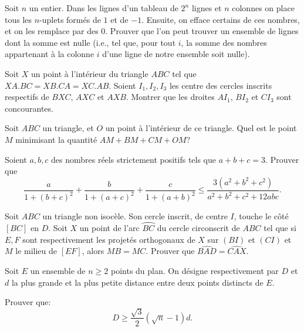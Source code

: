 \begin{exo}{}
Soit $n$ un entier. Dans les lignes d'un tableau de $2^n$ lignes et $n$ colonnes on place tous les $n$-uplets form\'es de $1$ et de $-1$. Ensuite, on efface certains de ces nombres, et on les remplace par des $0$. Prouver que l'on peut trouver un ensemble de lignes dont la somme est nulle (i.e., tel que, pour tout $i$, la somme des nombres appartenant \`a la colonne $i$ d'une ligne de notre ensemble soit nulle).
\end{exo}


\begin{exo}{}Soit $X$ un point à l'intérieur du triangle $ABC$ tel que $XA.BC = XB.CA = XC.AB$. Soient $I_1, I_{2}, I_{3}$  les centre des cercles inscrits respectifs de $BXC$, $AXC$ et $AXB$. Montrer que les droites $AI_1$, $BI_2$ et $CI_3$ sont concourantes.


\end{exo}

\begin{exo}{}Soit $ABC$ un triangle, et $O$ un point à l'intérieur de ce triangle. Quel est le point $M$ minimisant la quantité $AM+BM+CM+OM$?
\end{exo}

\begin{exo}{}Soient $a,b,c$ des nombres réels strictement positifs tels que $a+b+c=3$. Prouver que
$$ \frac{a}{1+(b+c)^2}+\frac{b}{1+(a+c)^2}+\frac{c}{1+(a+b)^2}\le\frac{3(a^2+b^2+c^2)}{a^2+b^2+c^2+12abc}.$$
\end{exo}

\begin{exo}{}Soit $ABC$ un triangle non isocèle. Son cercle inscrit, de centre $I$, touche le côté $[BC]$ en $D$. Soit $X$ un point de l'arc $ \wideparen {BC}$ du cercle circonscrit de $ABC$ tel que si $E,F$ sont respectivement les projetés orthogonaux de $X$ sur $(BI)$ et $(CI)$ et $M$ le milieu de $[EF]$, alors $MB=MC$. Prouver que $ \widehat{BAD}=\widehat{CAX} $.
\end{exo}


\begin{exo}{}
Soit $E$ un ensemble de $n \geq 2$ points du plan. On d\'esigne respectivement par $D$ et $d$ la plus grande et la plus petite distance entre deux points distincts de $E$. 

Prouver que:
$$D \geq  \frac{ \sqrt {3}}{2} ( \sqrt {n}-1) d.$$
\end{exo}


